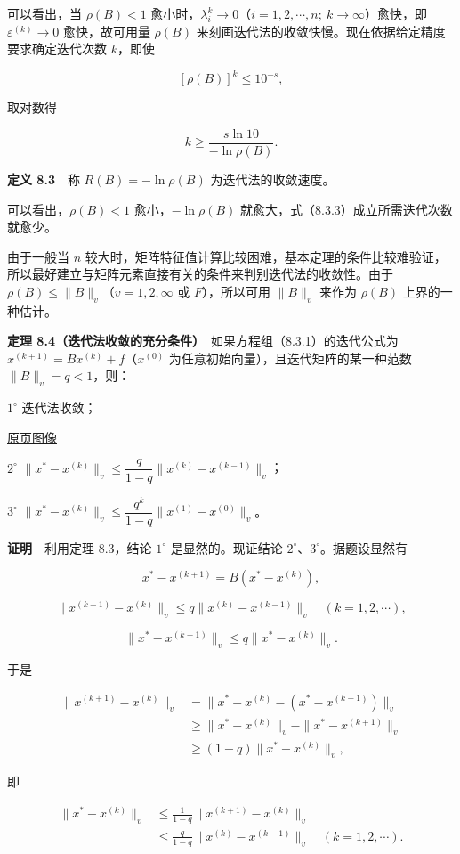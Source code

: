 \documentclass[
  10pt,
  fontset=fandol]{ctexart}
\begin{document}
可以看出，当 \(\rho(B)<1\) 愈小时，\(\lambda_i^k\to0\)（\(i=1,2,\cdots,n;\ k\to\infty\)）愈快，即 \(\varepsilon^{(k)}\to0\) 愈快，故可用量 \(\rho(B)\) 来刻画迭代法的收敛快慢。现在依据给定精度要求确定迭代次数 \(k\)，即使

\[
[\rho(B)]^k\leqslant10^{-s},
\tag{8.3.3}
\]

取对数得

\[
k\geqslant\frac{s\ln10}{-\ln\rho(B)}.
\]

\textbf{定义 8.3}　称 \(R(B)=-\ln\rho(B)\) 为迭代法的收敛速度。

可以看出，\(\rho(B)<1\) 愈小，\(-\ln\rho(B)\) 就愈大，式（8.3.3）成立所需迭代次数就愈少。

由于一般当 \(n\) 较大时，矩阵特征值计算比较困难，基本定理的条件比较难验证，所以最好建立与矩阵元素直接有关的条件来判别迭代法的收敛性。由于 \(\rho(B)\leqslant\|B\|_v\)（\(v=1,2,\infty\) 或 \(F\)），所以可用 \(\|B\|_v\) 来作为 \(\rho(B)\) 上界的一种估计。

\textbf{定理 8.4（迭代法收敛的充分条件）}　如果方程组（8.3.1）的迭代公式为 \(x^{(k+1)}=Bx^{(k)}+f\)（\(x^{(0)}\) 为任意初始向量），且迭代矩阵的某一种范数 \(\|B\|_v=q<1\)，则：

\(1^\circ\) 迭代法收敛；

\href{../../source-images/pdf-223.jpeg}{原页图像}

\(2^\circ\) \(\|x^*-x^{(k)}\|_v\leqslant\dfrac{q}{1-q}\|x^{(k)}-x^{(k-1)}\|_v\)；

\(3^\circ\) \(\|x^*-x^{(k)}\|_v\leqslant\dfrac{q^k}{1-q}\|x^{(1)}-x^{(0)}\|_v\)。

\textbf{证明}　利用定理 8.3，结论 \(1^\circ\) 是显然的。现证结论 \(2^\circ\)、\(3^\circ\)。据题设显然有

\[
x^*-x^{(k+1)}=B(x^*-x^{(k)}),
\tag{8.3.4}
\]

\[
\|x^{(k+1)}-x^{(k)}\|_v\leqslant q\|x^{(k)}-x^{(k-1)}\|_v\quad(k=1,2,\cdots),
\tag{8.3.5}
\]

\[
\|x^*-x^{(k+1)}\|_v\leqslant q\|x^*-x^{(k)}\|_v.
\tag{8.3.6}
\]

于是

\[
\begin{aligned}
\|x^{(k+1)}-x^{(k)}\|_v
&=\|x^*-x^{(k)}-(x^*-x^{(k+1)})\|_v\\
&\geqslant\|x^*-x^{(k)}\|_v-\|x^*-x^{(k+1)}\|_v\\
&\geqslant(1-q)\|x^*-x^{(k)}\|_v,
\end{aligned}
\]

即

\[
\begin{aligned}
\|x^*-x^{(k)}\|_v
&\leqslant\frac1{1-q}\|x^{(k+1)}-x^{(k)}\|_v\\
&\leqslant\frac{q}{1-q}\|x^{(k)}-x^{(k-1)}\|_v\quad(k=1,2,\cdots).
\end{aligned}
\]
\end{document}
